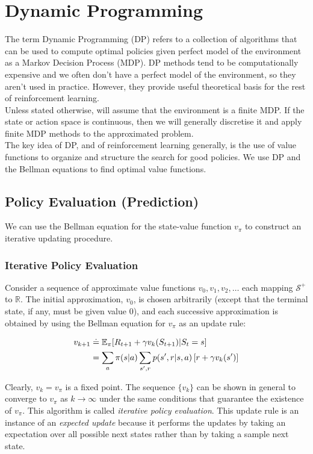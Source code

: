 
\section{Dynamic Programming}

The term Dynamic Programming (DP) refers to a collection of algorithms that can be used to compute optimal policies given perfect model of the environment as a Markov Decision Process (MDP). DP methods tend to be computationally expensive and we often don't have a perfect model of the environment, so they aren't used in practice. However, they provide useful theoretical basis for the rest of reinforcement learning. \\

Unless stated otherwise, will assume that the environment is a finite MDP. If the state or action space is continuous, then we will generally discretise it and apply finite MDP methods to the approximated problem.\\

The key idea of DP, and of reinforcement learning generally, is the use of value functions to organize and structure the search for good policies. We use DP and the Bellman equations to find optimal value functions. 

\subsection{Policy Evaluation (Prediction)}
We can use the Bellman equation for the state-value function $v_\pi$ to construct an iterative updating procedure.

\subsubsection*{Iterative Policy Evaluation}
Consider a sequence of approximate value functions $v_0, v_1, v_2, \dots$ each mapping $\mathcal{S}^{+}$ to $\mathbb{R}$. The initial approximation, $v_0$, is chosen arbitrarily (except that the terminal state, if any, must be given value $0$), and each successive approximation is obtained by using the Bellman equation for $v_\pi$ as an update rule:

\begin{align}
    v_{k+1} &\doteq \mathbb{E}_\pi [R_{t+1} + \gamma v_{k}(S_{t+1}) | S_t = s] \\
            &= \sum_a \pi(s|a) \sum_{s', r} p(s', r| s, a) \left[r + \gamma v_k(s')\right]
\end{align}

Clearly, $v_k = v_\pi$ is a fixed point. The sequence $\{v_k\}$ can be shown in general to converge to $v_\pi$ as $k \to \infty$ under the same conditions that guarantee the existence of $v_\pi$. This algorithm is called \emph{iterative policy evaluation}. This update rule is an instance of an \emph{expected update} because it performs the updates by taking an expectation over all possible next states rather than by taking a sample next state.\\

